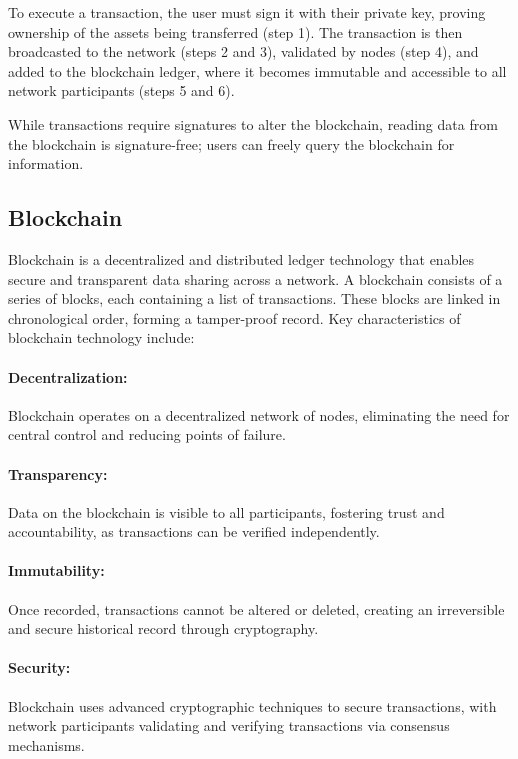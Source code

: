 To execute a transaction, the user must sign it with their private key, proving
ownership of the assets being transferred (step 1). The transaction is then
broadcasted to the network (steps 2 and 3), validated by nodes (step 4), and
added to the blockchain ledger, where it becomes immutable and accessible to
all network participants (steps 5 and 6).

While transactions require signatures to alter the blockchain, reading data
from the blockchain is signature-free; users can freely query the blockchain
for information.

\subsection{Blockchain}
\label{subsec:blockchain}

Blockchain is a decentralized and distributed ledger technology that enables
secure and transparent data sharing across a network. A blockchain consists of
a series of blocks, each containing a list of transactions. These blocks are
linked in chronological order, forming a tamper-proof record. Key
characteristics of blockchain technology include:

\paragraph{Decentralization:}
Blockchain operates on a decentralized network of nodes, eliminating the need
for central control and reducing points of failure.

\paragraph{Transparency:}
Data on the blockchain is visible to all participants, fostering trust and
accountability, as transactions can be verified independently.

\paragraph{Immutability:}
Once recorded, transactions cannot be altered or deleted, creating an
irreversible and secure historical record through cryptography.

\paragraph{Security:}
Blockchain uses advanced cryptographic techniques to secure transactions, with
network participants validating and verifying transactions via consensus
mechanisms.

